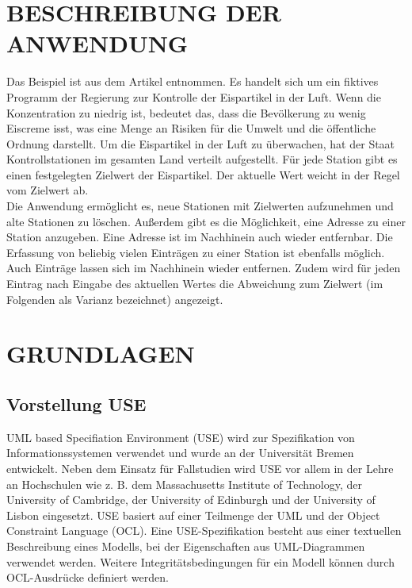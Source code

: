 \documentclass[a4paper,twoside]{article}
\begin{document}
\section{\uppercase{Beschreibung der Anwendung}}
\label{sec:iceCream}
\noindent
Das Beispiel ist aus dem Artikel \cite{Gui06} entnommen. Es handelt sich um ein fiktives Programm der Regierung zur Kontrolle der Eispartikel in der Luft. Wenn die Konzentration zu niedrig ist, bedeutet das, dass die Bevölkerung zu wenig Eiscreme isst, was eine Menge an Risiken für die Umwelt und die öffentliche Ordnung darstellt. Um die Eispartikel in der Luft zu überwachen, hat der Staat Kontrollstationen im gesamten Land verteilt aufgestellt. Für jede Station gibt es einen festgelegten Zielwert der Eispartikel. Der aktuelle Wert weicht in der Regel vom Zielwert ab. 
\\

Die Anwendung ermöglicht es, neue Stationen mit Zielwerten aufzunehmen und alte Stationen zu löschen. Außerdem gibt es die Möglichkeit, eine Adresse zu einer Station anzugeben. Eine Adresse ist im Nachhinein auch wieder entfernbar. Die Erfassung von beliebig vielen Einträgen zu einer Station ist ebenfalls möglich. Auch Einträge lassen sich im Nachhinein wieder entfernen. Zudem wird für jeden Eintrag nach Eingabe des aktuellen Wertes die Abweichung zum Zielwert (im Folgenden als Varianz bezeichnet) angezeigt.


\section{\uppercase{Grundlagen}}
\label{sec:basics}
\noindent

\subsection{Vorstellung USE} 
\label{ssec:use}
UML based Specifiation Environment (USE) wird zur Spezifikation von Informationssystemen verwendet und wurde an der Universität Bremen entwickelt. Neben dem Einsatz für Fallstudien wird USE vor allem in der Lehre an Hochschulen wie z. B. dem Massachusetts Institute of Technology, der University of Cambridge, der University of Edinburgh und der University of Lisbon eingesetzt. USE basiert auf einer Teilmenge der UML und der Object Constraint Language (OCL). Eine USE-Spezifikation besteht aus einer textuellen Beschreibung eines Modells, bei der Eigenschaften aus UML-Diagrammen verwendet werden. Weitere Integritätsbedingungen für ein Modell können durch OCL-Ausdrücke definiert werden. \cite{Use07} 
\end{document}
